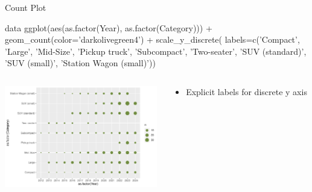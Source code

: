 \documentclass[ignorenonframetext,xcolor=x11names]{beamer}
\begin{document}


\begin{frame}[fragile]{Count Plot}
\begin{Rcode}
data %
ggplot(aes(as.factor(Year), as.factor(Category))) +
    geom_count(color='darkolivegreen4') +
    scale_y_discrete(
      labels=c('Compact', 'Large', 'Mid-Size', 'Pickup truck', 
               'Subcompact', 'Two-seater', 'SUV (standard)', 
               'SUV (small)', 'Station Wagon (small)'))
\end{Rcode}
\begin{columns}
\begin{column}{.65\textwidth}
  \includegraphics[height=1.75in]{fuel.count.pdf}
\end{column}
\begin{column}{.35\textwidth}
\footnotesize
\begin{itemize}
   \item Explicit labels for discrete y axis
\end{itemize}
\end{column}
\end{columns}
\end{frame}
\end{document}
